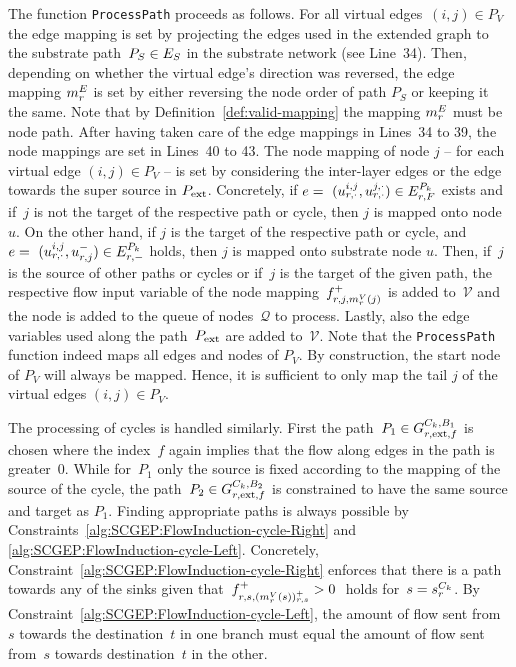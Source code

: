 \documentclass[10pt, conference, letterpaper]{IEEEtran}
\begin{document}
The function \texttt{ProcessPath} proceeds as follows. For all virtual edges~$(i,j) \in  P_V$ the edge mapping is set by projecting the edges used in the extended graph to the substrate path~$P_S \in E_S$  in the substrate network (see Line~34). Then, depending on whether the virtual edge's direction was reversed, the edge mapping $m^E_{r}$ is set by either reversing the node order of path $P_S$ or keeping it the same. Note that by Definition~\ref{def:valid-mapping} the mapping $m^E_{r}$ must be node path. 
After having taken care of the edge mappings in Lines~34 to 39, the node mappings are set in Lines~40 to 43. The node mapping of node $j$ -- for each virtual edge $(i,j) \in  P_V$ -- is set by considering the inter-layer edges or the edge towards the super source in $P_{\textnormal{ext}}$. Concretely, if $e =~(u^{i,j}_{\req,\cdot}, u^{j,\cdot}_{\req,\cdot}) \in  \VEextpathF$ exists and if~$j$ is not the target of the respective path or cycle, then $j$ is mapped onto node $u$. On the other hand, if $j$ is the target of the respective path or cycle, and $e =~(u^{i,j}_{\req,\cdot}, u^-_{\req, j}) \in  \VEextpathTargets$ holds, then $j$ is mapped onto substrate node $u$. Then, if~$j$ is the source of other paths or cycles or if~$j$ is the target of the given path, the respective flow input variable of the node mapping~$f^+_{r, j, m^V_{r}(j)}$ is added to~$\mathcal{V}$ and the node is added to the queue of nodes~$\mathcal{Q}$ to process.
Lastly, also the edge variables used along the path~$P_{\textnormal{ext}}$ are added to~$\mathcal{V}$. Note that the \texttt{ProcessPath} function indeed maps all edges and nodes of $P_V$. By construction, the start node of $P_V$ will always be mapped. Hence, it is sufficient to only map the tail $j$ of the virtual edges $(i,j) \in  P_V$. 

The processing of cycles is handled similarly. First the path~$P_1 \in \VGextcycleFlowBranchR$ is chosen where the index~$f$ again implies that the flow along edges in the path is greater~$0$. While for~$P_1$ only the source is fixed according to the mapping of the source of the cycle, the path~$P_2 \in \VGextcycleFlowBranchL$ is constrained to have the same source and target as $P_1$. Finding appropriate paths is always possible by Constraints~\ref{alg:SCGEP:FlowInduction-cycle-Right} and \ref{alg:SCGEP:FlowInduction-cycle-Left}. Concretely, Constraint~\ref{alg:SCGEP:FlowInduction-cycle-Right} enforces that there is a path towards any of the sinks given that~$f^+_{r, s, (m^V_{r}(s))^+_{r, s}} > 0~$ holds for~$s = \VVcycleSource$. By Constraint~\ref{alg:SCGEP:FlowInduction-cycle-Left}, the amount of flow sent from~$s$ towards the destination~$t$ in one branch must equal the amount of flow sent from~$s$ towards destination~$t$ in the other.
\end{document}
